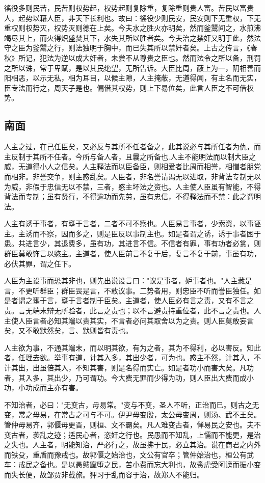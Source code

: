\documentclass[]{article}
\begin{document}
徭役多则民苦，民苦则权势起，权势起则复除重，复除重则贵人富。苦民以富贵人，起势以藉人臣，非天下长利也。故曰：徭役少则民安，民安则下无重权，下无重权则权势灭，权势灭则德在上矣。今夫水之胜火亦明矣，然而釜鬵间之，水煎沸竭尽其上，而火得炽盛焚其下，水失其所以胜者矣。今夫治之禁奸又明于此，然法守之臣为釜鬵之行，则法独明于胸中，而已失其所以禁奸者矣。上古之传言，《春秋》所记，犯法为逆以成大奸者，未尝不从尊贵之臣也。然而法令之所以备，刑罚之所以诛，常于卑赋，是以其民绝望，无所告诉。大臣比周，蔽上为一，阴相善而阳相恶，以示无私，相为耳目，以候主隙，人主掩蔽，无道得闻，有主名而无实，臣专法而行之，周天子是也。偏借其权势，则上下易位矣，此言人臣之不可借权势。

\hypertarget{header-n921}{%
\subsection{南面}\label{header-n921}}

人主之过，在己任臣矣，又必反与其所不任者备之，此其说必与其所任者为仇，而主反制于其所不任者。今所与备人者，且曩之所备也.人主不能明法而以制大臣之威，无道得小人之信矣。人主释法而以臣备臣，则相爱者比周而相誉，相憎者朋党而相非。非誉交争，则主惑乱矣。人臣者，非名誉请谒无以进取，非背法专制无以为威，非假于忠信无以不禁，三者，愍主坏法之资也。人主使人臣虽有智能，不得背法而专制；虽有贤行，不得逾功而先劳，虽有忠信，不得释法而不禁：此之谓明法。

人主有诱于事者，有壅于言者，二者不可不察也。人臣易言事者，少索资，以事诬主。主诱而不察，因而多之，则是臣反以事制主也。如是者谓之诱，诱于事者困于患。共进言少，其退费多，虽有功，其进言不信。不信者有罪，事有功者必赏，则群臣莫敢饰言以愍主。主道者，使人臣前言不复于后，复言不复于前，事虽有功，必伏其罪，谓之任下。

人臣为主设事而恐其非也，则先出说设言曰："议是事者，妒事者也。"人主藏是言，不更听群臣；群臣畏是言，不敢议事。二势者用，则忠臣不听而誉臣独任。如是者谓之壅于言，壅于言者制于臣矣。主道者，使人臣必有言之责，又有不言之责。言无端末辩无所验者，此言之责也；以不言避责持重位者，此不言之责也。人主使人臣言者必知其端以责其实，不言者必问其取舍以为之责。则人臣莫敢妄言矣，又不敢默然矣，言、默则皆有责也。

人主欲为事，不通其端末，而以明其欲，有为之者，其为不得利，必以害反。知此者，任理去欲。举事有道，计其入多，其出少者，可为也。惑主不然，计其入，不计其出，出虽倍其入，不知其害，则是名得而实亡。如是者功小而害大矣。凡功者，其入多，其出少，乃可谓功。今大费无罪而少得为功，则人臣出大费而成小功，小功成而主亦有害。

不知治者，必曰："无变古，毋易常。"变与不变，圣人不听，正治而已。则古之无变，常之毋易，在常古之可与不可。伊尹毋变殷，太公毋变周，则汤、武不王矣。管仲毋易齐，郭偃毋更晋，则桓、文不霸矣。凡人难变古者，惮易民之安也。夫不变古者，袭乱之迹；适民心者，恣奸之行也。民愚而不知乱，上懦而不能更，是治之失也。人主者，明能知治，严必行之，故虽拂于民，必立其治。说在商君之内外而铁殳，重盾而豫戒也。故郭偃之始治也，文公有官卒；管仲始治也，桓公有武车：戒民之备也。是以愚戆窳堕之民，苦小费而忘大利也，故夤虎受阿谤而振小变而失长便，故邹贾非载旅。狎习于乱而容于治，故郑人不能归。
\end{document}
